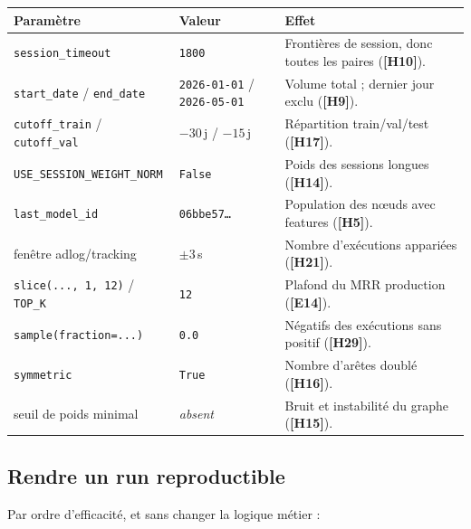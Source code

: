 \documentclass[11pt,a4paper]{article}
\newcommand{\code}[1]{\texttt{\small #1}}
\newcommand{\hyp}[1]{\textcolor{hypcol}{\textbf{\small [#1]}}}
\begin{document}
\begin{center}\small
\begin{tabular}{@{}l l p{7.6cm}@{}}
\toprule
\textbf{Paramètre} & \textbf{Valeur} & \textbf{Effet} \\
\midrule
\code{session\_timeout} & \code{1800} & Frontières de session, donc toutes les paires (\hyp{H10}). \\
\code{start\_date} / \code{end\_date} & \code{2026-01-01} / \code{2026-05-01} & Volume total ; dernier jour exclu (\hyp{H9}). \\
\code{cutoff\_train} / \code{cutoff\_val} & $-30$\,j / $-15$\,j & Répartition train/val/test (\hyp{H17}). \\
\code{USE\_SESSION\_WEIGHT\_NORM} & \code{False} & Poids des sessions longues (\hyp{H14}). \\
\code{last\_model\_id} & \code{06bbe57\dots} & Population des nœuds avec features (\hyp{H5}). \\
fenêtre adlog/tracking & $\pm 3$\,s & Nombre d'exécutions appariées (\hyp{H21}). \\
\code{slice(..., 1, 12)} / \code{TOP\_K} & \code{12} & Plafond du MRR production (\hyp{E14}). \\
\code{sample(fraction=...)} & \code{0.0} & Négatifs des exécutions sans positif (\hyp{H29}). \\
\code{symmetric} & \code{True} & Nombre d'arêtes doublé (\hyp{H16}). \\
seuil de poids minimal & \emph{absent} & Bruit et instabilité du graphe (\hyp{H15}). \\
\bottomrule
\end{tabular}
\end{center}

\subsection{Rendre un run reproductible}

Par ordre d'efficacité, et sans changer la logique métier :
\end{document}
